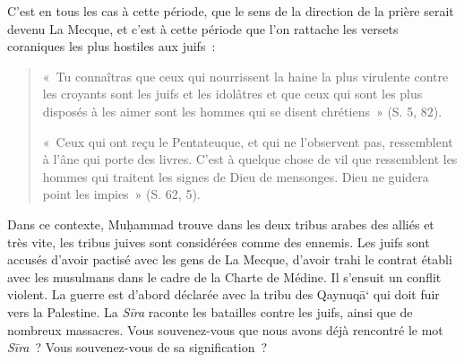 C'est en tous les cas à cette période, que le sens de la direction de la
prière serait devenu La Mecque, et c'est à cette période que l'on
rattache les versets coraniques les plus hostiles aux juifs~:

\begin{quote}
    

«~Tu connaîtras que ceux qui nourrissent la haine la plus virulente
contre les croyants sont les juifs et les idolâtres et que ceux qui sont
les plus disposés à les aimer sont les hommes qui se disent chrétiens~»
(S. 5, 82).

«~Ceux qui ont reçu le Pentateuque, et qui ne l'observent pas,
ressemblent à l'âne qui porte des livres. C'est à quelque chose de vil
que ressemblent les hommes qui traitent les signes de Dieu de mensonges.
Dieu ne guidera point les impies~» (S. 62, 5).
\end{quote}
Dans ce contexte, Muḥammad trouve dans les deux tribus arabes des alliés
et très vite, les tribus juives sont considérées comme des ennemis. Les
juifs sont accusés d'avoir pactisé avec les gens de La Mecque, d'avoir
trahi le contrat établi avec les musulmans dans le cadre de la Charte de
Médine. Il s'ensuit un conflit violent. La guerre est d'abord déclarée
avec la tribu des Qaynuqā` qui doit fuir vers la Palestine. La
\emph{Sīra} raconte les batailles contre les juifs, ainsi que de
nombreux massacres. Vous souvenez-vous que nous avons déjà rencontré le
mot \emph{Sīra}~? Vous souvenez-vous de sa signification~?



